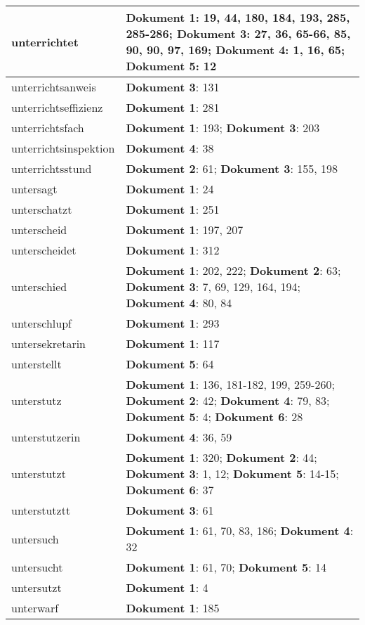 \documentclass[a5paper]{article}
\begin{document}
\begin{longtable}[l]{|l|p{3in}|}
\hline
unterrichtet & \textbf{Dokument 1}: 19, 44, 180, 184, 193, 285, 285-286; \textbf{Dokument 3}: 27, 36, 65-66, 85, 90, 90, 97, 169; \textbf{Dokument 4}: 1, 16, 65; \textbf{Dokument 5}: 12 \\
\hline
unterrichtsanweis & \textbf{Dokument 3}: 131 \\
\hline
unterrichtseffizienz & \textbf{Dokument 1}: 281 \\
\hline
unterrichtsfach & \textbf{Dokument 1}: 193; \textbf{Dokument 3}: 203 \\
\hline
unterrichtsinspektion & \textbf{Dokument 4}: 38 \\
\hline
unterrichtsstund & \textbf{Dokument 2}: 61; \textbf{Dokument 3}: 155, 198 \\
\hline
untersagt & \textbf{Dokument 1}: 24 \\
\hline
unterschatzt & \textbf{Dokument 1}: 251 \\
\hline
unterscheid & \textbf{Dokument 1}: 197, 207 \\
\hline
unterscheidet & \textbf{Dokument 1}: 312 \\
\hline
unterschied & \textbf{Dokument 1}: 202, 222; \textbf{Dokument 2}: 63; \textbf{Dokument 3}: 7, 69, 129, 164, 194; \textbf{Dokument 4}: 80, 84 \\
\hline
unterschlupf & \textbf{Dokument 1}: 293 \\
\hline
untersekretarin & \textbf{Dokument 1}: 117 \\
\hline
unterstellt & \textbf{Dokument 5}: 64 \\
\hline
unterstutz & \textbf{Dokument 1}: 136, 181-182, 199, 259-260; \textbf{Dokument 2}: 42; \textbf{Dokument 4}: 79, 83; \textbf{Dokument 5}: 4; \textbf{Dokument 6}: 28 \\
\hline
unterstutzerin & \textbf{Dokument 4}: 36, 59 \\
\hline
unterstutzt & \textbf{Dokument 1}: 320; \textbf{Dokument 2}: 44; \textbf{Dokument 3}: 1, 12; \textbf{Dokument 5}: 14-15; \textbf{Dokument 6}: 37 \\
\hline
unterstutztt & \textbf{Dokument 3}: 61 \\
\hline
untersuch & \textbf{Dokument 1}: 61, 70, 83, 186; \textbf{Dokument 4}: 32 \\
\hline
untersucht & \textbf{Dokument 1}: 61, 70; \textbf{Dokument 5}: 14 \\
\hline
untersutzt & \textbf{Dokument 1}: 4 \\
\hline
unterwarf & \textbf{Dokument 1}: 185 \\
\hline

\end{longtable}
\end{document}
